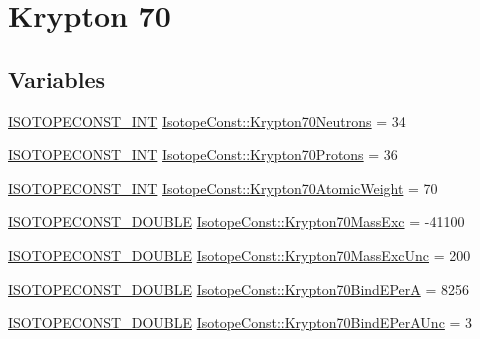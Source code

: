 \hypertarget{group___isotope_const-_krypton-_kr70}{}\section{Krypton 70}
\label{group___isotope_const-_krypton-_kr70}
\subsection*{Variables}
\begin{DoxyCompactItemize}
\item 
\mbox{\hyperlink{group___isotope_const-_macros_ga5f18360b3e99483a35c32d789e62621c}{I\+S\+O\+T\+O\+P\+E\+C\+O\+N\+S\+T\+\_\+\+I\+NT}} \mbox{\hyperlink{group___isotope_const-_krypton-_kr70_ga6e90ff0bf4b9f846a22c5d99112fb224}{Isotope\+Const\+::\+Krypton70\+Neutrons}} = 34
\item 
\mbox{\hyperlink{group___isotope_const-_macros_ga5f18360b3e99483a35c32d789e62621c}{I\+S\+O\+T\+O\+P\+E\+C\+O\+N\+S\+T\+\_\+\+I\+NT}} \mbox{\hyperlink{group___isotope_const-_krypton-_kr70_gabeb7721514c255de2d9712986aa70db6}{Isotope\+Const\+::\+Krypton70\+Protons}} = 36
\item 
\mbox{\hyperlink{group___isotope_const-_macros_ga5f18360b3e99483a35c32d789e62621c}{I\+S\+O\+T\+O\+P\+E\+C\+O\+N\+S\+T\+\_\+\+I\+NT}} \mbox{\hyperlink{group___isotope_const-_krypton-_kr70_gac80699e8606b7a61dbf0a90df64c3f9e}{Isotope\+Const\+::\+Krypton70\+Atomic\+Weight}} = 70
\item 
\mbox{\hyperlink{group___isotope_const-_macros_ga8f45a7272ce02c0b4c65c44636ed719a}{I\+S\+O\+T\+O\+P\+E\+C\+O\+N\+S\+T\+\_\+\+D\+O\+U\+B\+LE}} \mbox{\hyperlink{group___isotope_const-_krypton-_kr70_ga8513d208c46d82bbb26ed70aa05db4bc}{Isotope\+Const\+::\+Krypton70\+Mass\+Exc}} = -\/41100
\item 
\mbox{\hyperlink{group___isotope_const-_macros_ga8f45a7272ce02c0b4c65c44636ed719a}{I\+S\+O\+T\+O\+P\+E\+C\+O\+N\+S\+T\+\_\+\+D\+O\+U\+B\+LE}} \mbox{\hyperlink{group___isotope_const-_krypton-_kr70_gafae341bc5a6888760f47413a68947de8}{Isotope\+Const\+::\+Krypton70\+Mass\+Exc\+Unc}} = 200
\item 
\mbox{\hyperlink{group___isotope_const-_macros_ga8f45a7272ce02c0b4c65c44636ed719a}{I\+S\+O\+T\+O\+P\+E\+C\+O\+N\+S\+T\+\_\+\+D\+O\+U\+B\+LE}} \mbox{\hyperlink{group___isotope_const-_krypton-_kr70_gae5a4e7a41dc231b295efecbd93c1adcc}{Isotope\+Const\+::\+Krypton70\+Bind\+E\+PerA}} = 8256
\item 
\mbox{\hyperlink{group___isotope_const-_macros_ga8f45a7272ce02c0b4c65c44636ed719a}{I\+S\+O\+T\+O\+P\+E\+C\+O\+N\+S\+T\+\_\+\+D\+O\+U\+B\+LE}} \mbox{\hyperlink{group___isotope_const-_krypton-_kr70_gab164ee47d43d474394b5806d64e80da6}{Isotope\+Const\+::\+Krypton70\+Bind\+E\+Per\+A\+Unc}} = 3

\end{DoxyCompactItemize}
